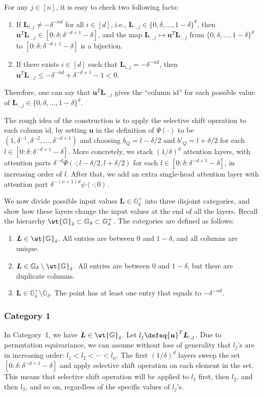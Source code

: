 \documentclass{article} %
\def\vu{{\bm{u}}}
\def\mL{{\bm{L}}}
\def\sG{{\mathbb{G}}}
\begin{document}
For any $j \in [n]$, it is easy to check two following facts:
\begin{enumerate}
\item If $\mL_{i,j} \neq -\delta^{-nd}$ for all $i \in [d]$, i.e., $\mL_{:,j} \in \{0, \delta, \dots, 1-\delta\}^d$, then $\vu^T \mL_{:,j} \in [0:\delta:\delta^{-d+1} - \delta]$, and the map $\mL_{:,j} \mapsto \vu^T \mL_{:,j}$ from $\{0, \delta, \dots, 1-\delta\}^d$ to $[0:\delta:\delta^{-d+1} - \delta]$ is a bijection.
\item If there exists $i \in [d]$ such that $\mL_{i,j} = -\delta^{-nd}$, then $\vu^T \mL_{:,j} \leq -\delta^{-nd} + \delta^{-d+1} - 1 < 0$.
\end{enumerate}
Therefore, one can say that $\vu^T \mL_{:,j}$ gives the ``column id'' for each possible value of $\mL_{:,j} \in \{0, \delta, \dots, 1-\delta\}^d$.

The rough idea of the construction is to apply the selective shift operation to each column id, by setting $\vu$ in the definition of $\Psi(\cdot)$ to be $(1, \delta^{-1}, \delta^{-2}, \dots, \delta^{-d+1})$ and choosing $b_Q = l - \delta/2$ and $b'_Q = l + \delta/2$ for each $l \in [0:\delta:\delta^{-d+1} - \delta]$.
More concretely, we stack $(1/\delta)^d$ attention layers, with attention parts $\delta^{-d} \Psi(\cdot;l-\delta/2,l+\delta/2)$ for each $l \in [0:\delta:\delta^{-d+1} - \delta]$, in increasing order of $l$.
After that, we add an extra single-head attention layer with attention part $\delta^{-(n+1)d} \psi(\cdot;0)$.

We now divide possible input values $\mL \in \sG^+_{\delta}$ into three disjoint categories, and show how these layers change the input values at the end of all the layers. Recall the hierarchy $\wt {\sG}_{\delta} \subset \sG_{\delta} \subset \sG^+_{\delta}$. The categories are defined as follows: 
\begin{enumerate}
    \item $\mL \in \wt {\sG}_{\delta}$. All entries are between $0$ and $1-\delta$, and all columns are unique.
    \item $\mL \in \sG_{\delta} \setminus \wt {\sG}_{\delta}$. All entries are between $0$ and $1-\delta$, but there are duplicate columns.
    \item $\mL \in \sG^+_{\delta} \setminus \sG_{\delta}$. The point has at least one entry that equals to $-\delta^{-nd}$.
\end{enumerate}

\subsubsection{Category 1}
\label{sec:proof-category1}
In Category~1, we have $\mL \in \wt {\sG}_{\delta}$.
Let $l_j \defeq \vu^T \mL_{:,j}$.
Due to permutation equivariance, we can assume without loss of generality that $l_j$'s are in increasing order: $l_1 < l_2 < \cdots < l_n$.
The first $(1/\delta)^d$ layers sweep the set $[0:\delta:\delta^{-d+1}-\delta]$ and apply selective shift operation on each element in the set. This means that selective shift operation will be applied to $l_1$ first, then $l_2$, and then $l_3$, and so on, regardless of the specific values of $l_j$'s.
\end{document}
